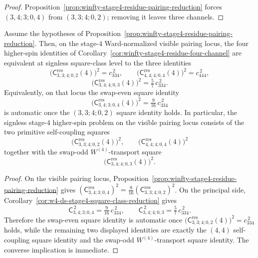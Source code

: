 \begin{proof}
Proposition~\ref{prop:winfty-stage4-residue-pairing-reduction} forces $(3,4;3;0,4)$ from $(3,3;4;0,2)$; removing it leaves three channels.
\end{proof}

\begin{corollary}
\label{cor:winfty-stage4-primitive-transport-square-triple}
Assume the hypotheses of
Proposition~\ref{prop:winfty-stage4-residue-pairing-reduction}. Then,
on the stage-$4$ Ward-normalized visible pairing locus, the four
higher-spin identities of
Corollary~\ref{cor:winfty-stage4-residue-four-channel} are equivalent
at signless square-class level to the three identities
\[
\bigl(\mathsf{C}^{\mathrm{res}}_{3,3;4;0,2}(4)\bigr)^2
=
c_{334}^{\,2},
\qquad
\bigl(\mathsf{C}^{\mathrm{res}}_{4,4;4;0,4}(4)\bigr)^2
=
c_{444}^{\,2},
\]
\[
\bigl(\mathsf{C}^{\mathrm{res}}_{3,4;4;0,3}(4)\bigr)^2
=
\tfrac{5}{7}\,c_{334}^{\,2}.
\]
Equivalently, on that locus the swap-even square identity
\[
\bigl(\mathsf{C}^{\mathrm{res}}_{3,4;3;0,4}(4)\bigr)^2
=
\tfrac{9}{16}\,c_{334}^{\,2}
\]
is automatic once the \((3,3;4;0,2)\) square identity holds. In
particular, the signless stage-$4$ higher-spin problem on the visible
pairing locus consists of the two primitive self-coupling squares
\[
\bigl(\mathsf{C}^{\mathrm{res}}_{3,3;4;0,2}(4)\bigr)^2,
\qquad
\bigl(\mathsf{C}^{\mathrm{res}}_{4,4;4;0,4}(4)\bigr)^2
\]
together with the swap-odd \(W^{(4)}\)-transport square
\[
\bigl(\mathsf{C}^{\mathrm{res}}_{3,4;4;0,3}(4)\bigr)^2.
\]
\end{corollary}

\begin{proof}
On the visible pairing locus, Proposition~\ref{prop:winfty-stage4-residue-pairing-reduction} gives
$(\mathsf{C}^{\mathrm{res}}_{3,4;3;0,4})^2 = \tfrac{9}{16}(\mathsf{C}^{\mathrm{res}}_{3,3;4;0,2})^2$.
On the principal side,
Corollary~\ref{cor:w4-ds-stage4-square-class-reduction} gives
\[
\mathsf{C}_{3,4;3;0,4}^{\,2}
=
\tfrac{9}{16}\,c_{334}^{\,2},
\qquad
\mathsf{C}_{3,4;4;0,3}^{\,2}
=
\tfrac{5}{7}\,c_{334}^{\,2}.
\]
Therefore the swap-even square identity is automatic once
\(
\bigl(\mathsf{C}^{\mathrm{res}}_{3,3;4;0,2}(4)\bigr)^2=c_{334}^{\,2}
\)
holds, while the remaining two displayed identities are exactly the
\((4,4)\) self-coupling square identity and the swap-odd
\(W^{(4)}\)-transport square identity. The converse implication is
immediate.
\end{proof}

